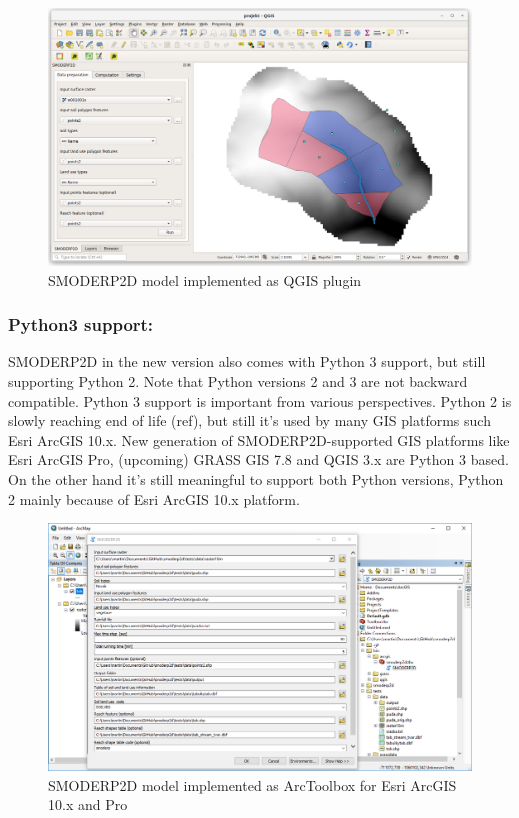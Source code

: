 \begin{figure}[ht!]
  \begin{center}
    \includegraphics[width=1.0\columnwidth]{figures/smoderp2d_qgis.png}
    \caption{SMODERP2D model implemented as QGIS plugin}
    \label{fig:smoderp2_qgis}
  \end{center}
\end{figure}

\subsubsection{Python3 support:}
SMODERP2D in the new version also comes with Python 3 support, but
still supporting Python 2. Note that Python versions 2 and 3 are not
backward compatible.  Python 3 support is important from various
perspectives. Python 2 is slowly reaching end of life (ref), but still
it’s used by many GIS platforms such Esri ArcGIS 10.x. New generation
of SMODERP2D-supported GIS platforms like Esri ArcGIS Pro, (upcoming)
GRASS GIS 7.8 and QGIS 3.x are Python 3 based. On the other hand it’s
still meaningful to support both Python versions, Python 2 mainly
because of Esri ArcGIS 10.x platform.

\begin{figure}[ht!]
  \begin{center}
    \includegraphics[width=1.0\columnwidth]{figures/smoderp2d_arcgis.png}
    \caption{SMODERP2D model implemented as ArcToolbox for Esri ArcGIS
      10.x and Pro}
    \label{fig:uml_diagram}
  \end{center}
\end{figure}
